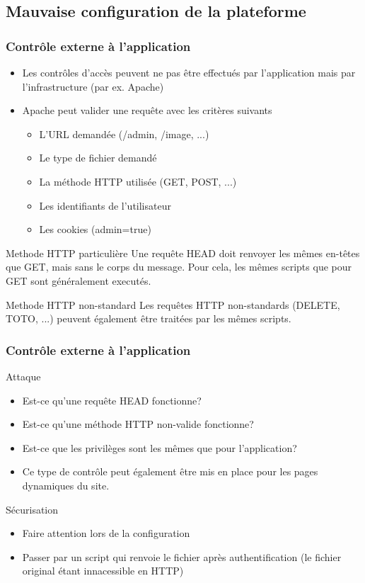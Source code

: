 \documentclass{beamer}
\begin{document}
\subsection{Mauvaise configuration de la plateforme}
\begin{frame}
  \frametitle{Contrôle externe à l'application}
  \begin{itemize}
    \item Les contrôles d'accès peuvent ne pas être effectués par l'application mais par l'infrastructure (par ex. Apache)
    \item Apache peut valider une requête avec les critères suivants
    \begin{itemize}
      \item L'URL demandée (/admin, /image, ...)
      \item Le type de fichier demandé
      \item La méthode HTTP utilisée (GET, POST, ...)
      \item Les identifiants de l'utilisateur
      \item Les cookies (admin=true)
    \end{itemize}
  \end{itemize}
  \begin{block}{Methode HTTP particulière}
    Une requête HEAD doit renvoyer les mêmes en-têtes que GET, mais sans le corps du message. Pour cela, les mêmes scripts que pour GET sont généralement executés.
  \end{block}
  \begin{block}{Methode HTTP non-standard}
    Les requêtes HTTP non-standards (DELETE, TOTO, ...) peuvent également être traitées par les mêmes scripts.
  \end{block}
\end{frame}
\begin{frame}
  \frametitle{Contrôle externe à l'application}
  \begin{alertblock}{Attaque}
    \begin{itemize}
      \item Est-ce qu'une requête HEAD fonctionne?
      \item Est-ce qu'une méthode HTTP non-valide fonctionne?
      \item Est-ce que les privilèges sont les mêmes que pour l'application?
      \item Ce type de contrôle peut également être mis en place pour les pages dynamiques du site.
    \end{itemize}
  \end{alertblock}
  \begin{exampleblock}{Sécurisation}
    \begin{itemize}
      \item Faire attention lors de la configuration
      \item Passer par un script qui renvoie le fichier après authentification (le fichier original étant innacessible en HTTP)
    \end{itemize}
  \end{exampleblock}
\end{frame}
\end{document}
